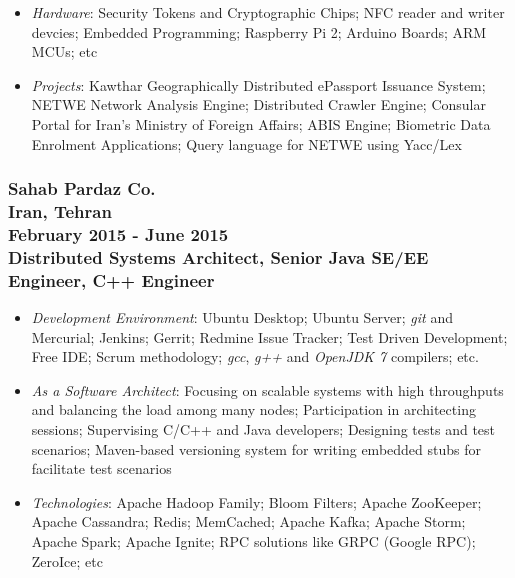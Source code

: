 \documentclass[10pt,a4paper]{article}
\begin{document}
\begin{itemize}
    \item \small \textit {Hardware}: Security Tokens and Cryptographic Chips; NFC reader and writer devcies; Embedded Programming; Raspberry Pi 2; Arduino Boards; ARM MCUs; etc
    \item \small \textit {Projects}: Kawthar Geographically Distributed ePassport Issuance System; NETWE Network Analysis Engine; Distributed Crawler Engine; Consular Portal for Iran's Ministry of Foreign Affairs; ABIS Engine; Biometric Data Enrolment Applications; Query language for NETWE using Yacc/Lex
  \end{itemize}
  \setlength{\leftskip}{0pt}
  \setlength{\rightskip}{0cm}
	  
\subsubsection{{\large Sahab Pardaz Co.} \\ \textnormal{Iran, Tehran} \\ \textnormal{February 2015 - June 2015} \\ {Distributed Systems Architect, Senior Java SE/EE Engineer, C++ Engineer}}
	\setlength{\leftskip}{0.5cm}
  \setlength{\rightskip}{1cm}
  \begin{itemize}
    \setlength{\rightskip}{1cm}
    \setlength\itemsep{0em}
    \item \small \textit {Development Environment}: Ubuntu Desktop; Ubuntu Server; \textit{git} and Mercurial; Jenkins; Gerrit; Redmine Issue Tracker; Test Driven Development; Free IDE; Scrum methodology; \textit{gcc}, \textit{g++} and \textit{OpenJDK 7} compilers; etc.
    \item \small \textit {As a Software Architect}: Focusing on scalable systems with high throughputs and balancing the load among many nodes; Participation in architecting sessions; Supervising C/C++ and Java developers; Designing tests and test scenarios; Maven-based versioning system for writing embedded stubs for facilitate test scenarios
    \item \small \textit {Technologies}: Apache Hadoop Family; Bloom Filters; Apache ZooKeeper; Apache Cassandra; Redis; MemCached; Apache Kafka; Apache Storm; Apache Spark; Apache Ignite; RPC solutions like GRPC (Google RPC); ZeroIce; etc
  \end{itemize}
  \setlength{\leftskip}{0pt}
  \setlength{\rightskip}{0cm}
	  
\end{document}
